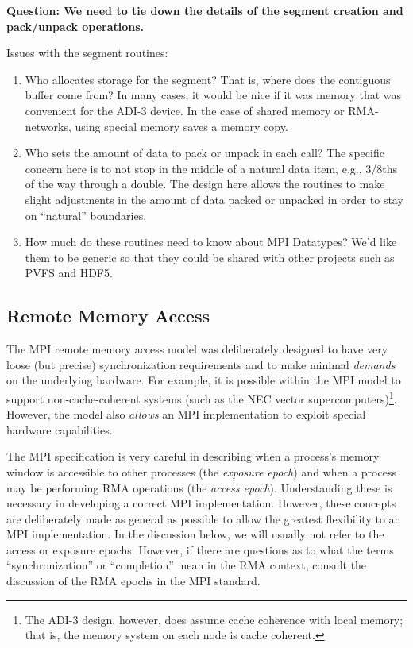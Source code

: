\textbf{Question: We need to tie down the details of the segment
creation and pack/unpack operations.}

Issues with the segment routines:
\begin{enumerate}
\item Who allocates storage for the segment?  That is, where does the
contiguous buffer come from?  In many cases, it would be nice if it
was memory that was convenient for the ADI-3 device.  In the case of
shared memory or RMA-networks, using special memory saves a memory
copy.

\item Who sets the amount of data to pack or unpack in each call?
The specific concern here is to not stop in the middle of a natural
data item, e.g., 3/8ths of the way through a double.  The design here
allows the routines to make slight adjustments in the amount of data
packed or unpacked in order to stay on ``natural'' boundaries.  

\item How much do these routines need to know about MPI Datatypes?
We'd like them to be generic so that they could be shared with other
projects such as PVFS and HDF5.  
\end{enumerate}


\subsection{Remote Memory Access}
\label{sec:rma-design}
The MPI remote memory access model was deliberately designed to have
very loose (but precise) synchronization requirements and to make
minimal \emph{demands} on 
the 
underlying hardware.  For example, it is possible within the MPI model
to support non-cache-coherent systems (such as the NEC vector
supercomputers)\footnote{The ADI-3 design, however, does assume cache
coherence with local memory; that is, the memory system on each node
is cache coherent.}.  However, the model also \emph{allows} an MPI 
implementation to exploit special hardware capabilities.  

%
The MPI specification is very careful in describing when a process's
memory window is accessible to other processes (the \emph{exposure
epoch}) and when a process
may be performing RMA operations (the 
\emph{access epoch}).
Understanding these is necessary in developing 
a correct MPI implementation.  However, these concepts are
deliberately made as general as possible to allow the greatest
flexibility to an MPI implementation.  In the discussion below, we
will usually not refer to the access or exposure epochs.  However, if
there are questions as to what the terms ``synchronization'' or
``completion'' mean in the RMA context, consult the discussion of the
RMA epochs in the MPI standard.

